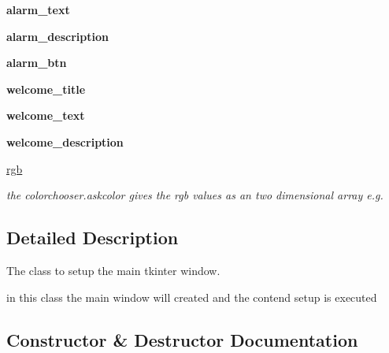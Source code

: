 \begin{DoxyCompactItemize}
\mbox{\label{class_python___client_1_1_window_function_ab43675dcd6b8697f5008c33f04fe44ca}} 
{\bfseries alarm\+\_\+text}
\item 
\mbox{\label{class_python___client_1_1_window_function_ac175ad2d731007f3714e4ff576afef6b}} 
{\bfseries alarm\+\_\+description}
\item 
\mbox{\label{class_python___client_1_1_window_function_a9c21f0b16d75b7c5077c77c4b2748013}} 
{\bfseries alarm\+\_\+btn}
\item 
\mbox{\label{class_python___client_1_1_window_function_a7b49e41bd8b8b3c8d4fbb67cfe1a0a41}} 
{\bfseries welcome\+\_\+title}
\item 
\mbox{\label{class_python___client_1_1_window_function_ae1eeba358d5e6c658eed7b7fbe678096}} 
{\bfseries welcome\+\_\+text}
\item 
\mbox{\label{class_python___client_1_1_window_function_ab1833e34efe0af6551de1de06a7ee2a9}} 
{\bfseries welcome\+\_\+description}
\item 
\mbox{\hyperlink{class_python___client_1_1_window_function_a6c0768916064d607a4d39441863eabe2}{rgb}}
\begin{DoxyCompactList}\small\item\em the colorchooser.\+askcolor gives the rgb values as an two dimensional array e.\+g. \end{DoxyCompactList}\end{DoxyCompactItemize}


\subsection{Detailed Description}
The class to setup the main tkinter window. 

in this class the main window will created and the contend setup is executed 

\subsection{Constructor \& Destructor Documentation}
\mbox{\label{class_python___client_1_1_window_function_a01d8492097a4aec1382b7d5611e539dd}} 
